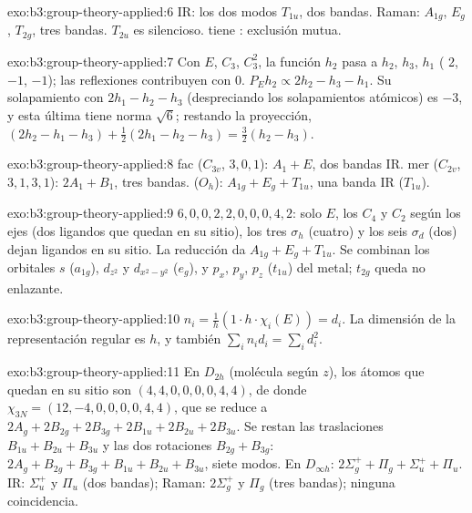 \begin{solution}{exo:b3:group-theory-applied:6}
IR: los dos modos $T_{1u}$, dos bandas. Raman: $A_{1g}$, $E_g$, $T_{2g}$, tres bandas.
$T_{2u}$ es silencioso.  tiene : exclusión mutua.
\end{solution}

\begin{solution}{exo:b3:group-theory-applied:7}
Con $E$, $C_3$, $C_3^2$, la función $h_2$ pasa a $h_2$, $h_3$, $h_1$ ( 2,
$-1$, $-1$); las reflexiones contribuyen con 0. $\hat P_Eh_2 \propto 2h_2 - h_3 - h_1$.
Su solapamiento con $2h_1 - h_2 - h_3$ (despreciando los solapamientos atómicos) es $-3$, y esta
última tiene norma $\sqrt6$; restando la proyección, $(2h_2 - h_1 - h_3) +
\frac12(2h_1 - h_2 - h_3) = \frac32(h_2 - h_3)$.
\end{solution}

\begin{solution}{exo:b3:group-theory-applied:8}
fac ($C_{3v}$,  $3, 0, 1$): $A_1 + E$, dos bandas IR. mer ($C_{2v}$,
 $3, 1, 3, 1$): $2A_1 + B_1$, tres bandas.  ($O_h$): $A_{1g} + E_g
+ T_{1u}$, una banda IR ($T_{1u}$).
\end{solution}

\begin{solution}{exo:b3:group-theory-applied:9}
 $6, 0, 0, 2, 2, 0, 0, 0, 4, 2$: solo $E$, los $C_4$ y $C_2$ según los
ejes (dos ligandos que quedan en su sitio), los tres $\sigma_h$ (cuatro) y los seis $\sigma_d$
(dos) dejan ligandos en su sitio. La reducción da $A_{1g} + E_g + T_{1u}$. Se combinan los orbitales $s$
($a_{1g}$), $d_{z^2}$ y $d_{x^2-y^2}$ ($e_g$), y $p_x$, $p_y$, $p_z$ ($t_{1u}$) del metal;
$t_{2g}$ queda no enlazante.
\end{solution}

\begin{solution}{exo:b3:group-theory-applied:10}
$n_i = \frac1h(1\cdot h\cdot\chi_i(E)) = d_i$. La dimensión de la representación
regular es $h$, y también $\sum_in_id_i = \sum_id_i^2$.
\end{solution}

\begin{solution}{exo:b3:group-theory-applied:11}
En $D_{2h}$ (molécula según $z$), los átomos que quedan en su sitio son
$(4, 4, 0, 0, 0, 0, 4, 4)$, de donde $\chi_{3N}
= (12, -4, 0, 0, 0, 0, 4, 4)$, que se reduce a $2A_g + 2B_{2g} + 2B_{3g} + 2B_{1u} + 2B_{2u}
+ 2B_{3u}$. Se restan las traslaciones $B_{1u} + B_{2u} + B_{3u}$ y las dos rotaciones
$B_{2g} + B_{3g}$: $2A_g + B_{2g} + B_{3g} + B_{1u} + B_{2u} + B_{3u}$, siete modos.
En $D_{\infty h}$: $2\Sigma_g^+ + \Pi_g + \Sigma_u^+ + \Pi_u$. IR: $\Sigma_u^+$ y $\Pi_u$
(dos bandas); Raman: $2\Sigma_g^+$ y $\Pi_g$ (tres bandas); ninguna coincidencia.
\end{solution}

